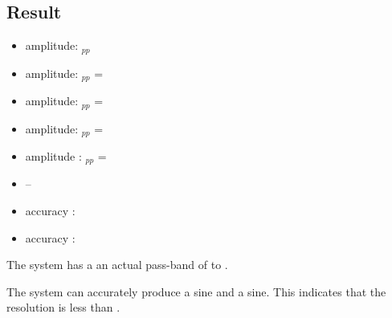 \subsection*{Result}
\begin{itemize}
    \item {} amplitude: $_{pp}$
    \item {} amplitude: $_{pp}$ = 
    \item {} amplitude: $_{pp}$ = 
    \item {} amplitude: $_{pp}$ = 
    \item {} amplitude : $_{pp}$ = 
    \item --
    \item {} accuracy : 
    \item {} accuracy :  
\end{itemize}



The system has a an actual pass-band of  to . 

The system can accurately produce a  sine and a  sine. This indicates that the resolution is less than .